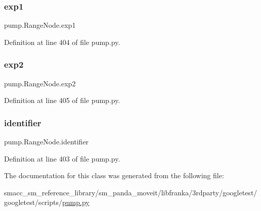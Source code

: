 \subsubsection{\texorpdfstring{exp1}{exp1}}
{\footnotesize\ttfamily pump.\+Range\+Node.\+exp1}



Definition at line 404 of file pump.\+py.

\mbox{\label{classpump_1_1RangeNode_afe153ee472b121652a51c62c1522cc13}} 
\subsubsection{\texorpdfstring{exp2}{exp2}}
{\footnotesize\ttfamily pump.\+Range\+Node.\+exp2}



Definition at line 405 of file pump.\+py.

\mbox{\label{classpump_1_1RangeNode_ae75b9f31ba8c3bd048cf09b22035efa0}} 
\subsubsection{\texorpdfstring{identifier}{identifier}}
{\footnotesize\ttfamily pump.\+Range\+Node.\+identifier}



Definition at line 403 of file pump.\+py.



The documentation for this class was generated from the following file\+:\begin{DoxyCompactItemize}
\item 
smacc\+\_\+sm\+\_\+reference\+\_\+library/sm\+\_\+panda\+\_\+moveit/libfranka/3rdparty/googletest/googletest/scripts/\hyperlink{pump_8py}{pump.\+py}\end{DoxyCompactItemize}
